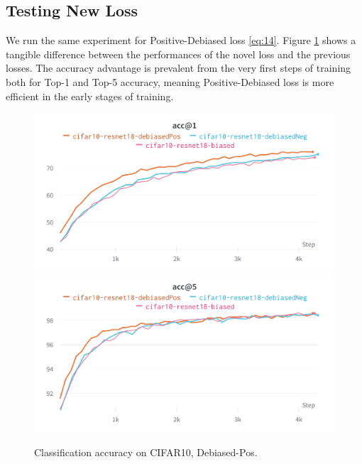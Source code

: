 \documentclass{article}
\begin{document}
\subsection{Testing New Loss}
We run the same experiment for Positive-Debiased loss \ref{eq:14}. Figure \ref{fig:fig2} shows a tangible difference between the performances of the novel loss and the previous losses. The accuracy advantage is prevalent from the very first steps of training both for Top-1 and Top-5 accuracy, meaning Positive-Debiased loss is more efficient in the early stages of training.  



\begin{figure}[!htb]
\includegraphics[width=\linewidth]{figures/3_losses.png}
\endminipage\hfill
{}
\includegraphics[width=\linewidth]{figures/3_losses_5.png}
\endminipage
\caption{Classification accuracy on CIFAR10, Debiased-Pos.}
\label{fig:fig2}
\end{figure}
\end{document}

